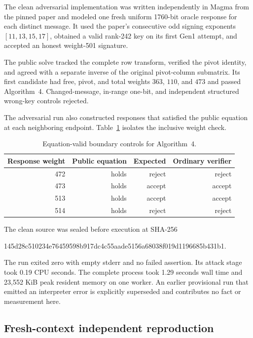 \documentclass[10pt,a4paper]{article}
\begin{document}
The clean adversarial implementation was written independently in Magma from
the pinned paper and modeled one fresh uniform 1760-bit oracle response for
each distinct message. It used the paper's consecutive odd signing exponents
$[11,13,15,17]$, obtained a valid rank-242 key on its first Gen1 attempt, and
accepted an honest weight-501 signature.

The public solve tracked the complete row transform, verified the pivot
identity, and agreed with a separate inverse of the original pivot-column
submatrix. Its first candidate had free, pivot, and total weights
$363$, $110$, and $473$ and passed Algorithm~4. Changed-message, in-range
one-bit, and independent structured wrong-key controls rejected.

The adversarial run also constructed responses that satisfied the public
equation at each neighboring endpoint. Table~\ref{tab:endpoints} isolates the
inclusive weight check.

\begin{table}[ht]
\centering
\small
\begin{tabular}{@{}rrrr@{}}
\toprule
Response weight & Public equation & Expected & Ordinary verifier\\
\midrule
472 & holds & reject & reject\\
473 & holds & accept & accept\\
513 & holds & accept & accept\\
514 & holds & reject & reject\\
\bottomrule
\end{tabular}
\caption{Equation-valid boundary controls for Algorithm~4.}
\label{tab:endpoints}
\end{table}

The clean source was sealed before execution at SHA-256
\begin{center}
\small\ttfamily
145d28c510234e76459598b917dc4c55aade5156a68038f019d1196685b431b1.
\end{center}
The run exited zero with empty stderr and no failed assertion. Its attack
stage took 0.19 CPU seconds. The complete process took 1.29 seconds wall time
and 23,552 KiB peak resident memory on one worker. An earlier provisional run
that emitted an interpreter error is explicitly superseded and contributes no
fact or measurement here.

\subsection{Fresh-context independent reproduction}
\end{document}
